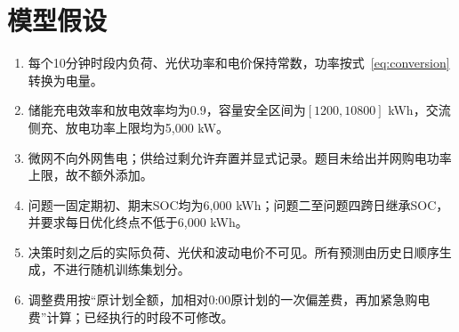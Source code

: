 \section{模型假设}
\begin{enumerate}
\item 每个10分钟时段内负荷、光伏功率和电价保持常数，功率按式~\eqref{eq:conversion}转换为电量。
\item 储能充电效率和放电效率均为0.9，容量安全区间为$[1200,10800]$ kWh，交流侧充、放电功率上限均为5,000 kW。
\item 微网不向外网售电；供给过剩允许弃置并显式记录。题目未给出并网购电功率上限，故不额外添加。
\item 问题一固定期初、期末SOC均为6,000 kWh；问题二至问题四跨日继承SOC，并要求每日优化终点不低于6,000 kWh。
\item 决策时刻之后的实际负荷、光伏和波动电价不可见。所有预测由历史日顺序生成，不进行随机训练集划分。
\item 调整费用按“原计划全额，加相对0:00原计划的一次偏差费，再加紧急购电费”计算；已经执行的时段不可修改。
\end{enumerate}
